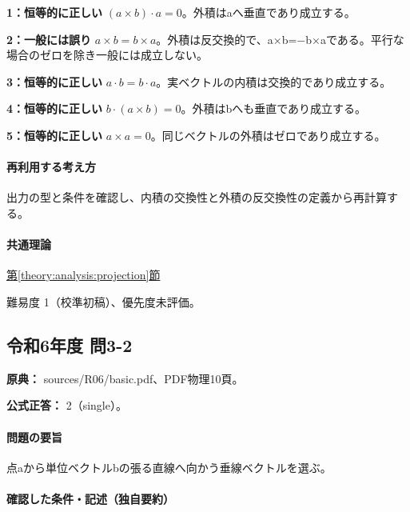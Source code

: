 \noindent\textbf{1：恒等的に正しい} \((a\times b)\cdot a=0\)。外積はaへ垂直であり成立する。\par

\noindent\textbf{2：一般には誤り} \(a\times b=b\times a\)。外積は反交換的で、a×b=−b×aである。平行な場合のゼロを除き一般には成立しない。\par

\noindent\textbf{3：恒等的に正しい} \(a\cdot b=b\cdot a\)。実ベクトルの内積は交換的であり成立する。\par

\noindent\textbf{4：恒等的に正しい} \(b\cdot(a\times b)=0\)。外積はbへも垂直であり成立する。\par

\noindent\textbf{5：恒等的に正しい} \(a\times a=0\)。同じベクトルの外積はゼロであり成立する。\par

\paragraph{再利用する考え方} 出力の型と条件を確認し、内積の交換性と外積の反交換性の定義から再計算する。

\paragraph{共通理論} \hyperref[theory:analysis:projection]{第\ref*{theory:analysis:projection}節}

\par 難易度 1（校準初稿）、優先度未評価。

\subsection{令和6年度 問3-2}
\label{q:r06-reg-basic-3-2}

\noindent\textbf{原典：} sources/R06/basic.pdf、PDF物理10頁。

\textbf{公式正答：} 2（single）。

\paragraph{問題の要旨} 点aから単位ベクトルbの張る直線へ向かう垂線ベクトルを選ぶ。

\paragraph{確認した条件・記述（独自要約）}\mbox{}\par

